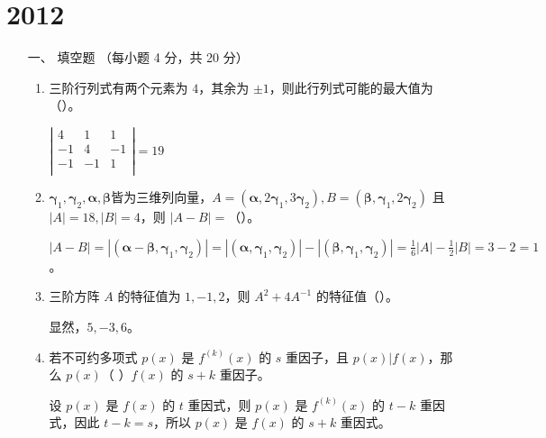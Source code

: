\section{2012}
\begin{enumerate}[1~]
\renewcommand{\labelenumi}{\textbf{\theenumi. }}
\renewcommand{\Im}{\text{Im }}
\item[一、]
填空题 （每小题 4 分，共 20 分）
\begin{enumerate}[1.~]
\item
三阶行列式有两个元素为 $4$，其余为 $\pm 1$，则此行列式可能的最大值为（\quad）。 
\begin{solution}
$\left| \begin{matrix}
	4&		1&		1\\
	-1&		4&		-1\\
	-1&		-1&		1\\
\end{matrix} \right|=19$
\end{solution}
\item
$\boldsymbol{\gamma} _ { 1 } , \boldsymbol{\gamma} _ { 2 } , \boldsymbol{\alpha} , \boldsymbol{\beta}$皆为三维列向量，$A = \left( \boldsymbol{\alpha} , 2 \boldsymbol{\gamma} _ { 1 } , 3 \boldsymbol{\gamma} _ { 2 } \right) , B = \left( \boldsymbol{\beta} , \boldsymbol{\gamma} _ { 1 } , 2 \boldsymbol{\gamma} _ { 2 } \right)$ 且 $| A | = 18 , | B | = 4$，则 $|A - B| =$（\quad）。 
\begin{solution}
$|A-B|=|(\boldsymbol{\alpha}-\boldsymbol{\beta}, \boldsymbol{\gamma}_1, \boldsymbol{\gamma}_2)|=|(\boldsymbol{\alpha}, \boldsymbol{\gamma}_1, \boldsymbol{\gamma}_2)|-|(\boldsymbol{\beta}, \boldsymbol{\gamma}_1, \boldsymbol{\gamma}_2)|=\frac16 |A|- \frac12 |B|=3-2=1$。
\end{solution}

\item
三阶方阵 $A$ 的特征值为 $1 , - 1, 2$，则 $A ^ { 2 } + 4 A ^ { - 1 }$ 的特征值（\quad）。 

\begin{solution}
显然，$5, -3, 6$。
\end{solution}

\item
若不可约多项式 $ p(x) $ 是 $ f^{(k)}(x)$ 的 $s$ 重因子，且 $p ( x ) | f ( x )$，那么 $ p(x) $（ \quad ）$f(x)$ 的 $s + k$ 重因子。

\begin{solution}
设 $p(x)$ 是 $f(x)$ 的 $t$ 重因式，则 $p(x)$ 是 $f^{(k)}(x)$ 的 $t - k$ 重因式，因此 $t - k =s$，所以 $p(x)$ 是 $f(x)$ 的 $s+ k$ 重因式。
\end{solution}


\end{enumerate}
\end{enumerate}
